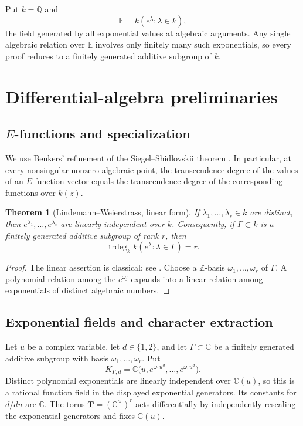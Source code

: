 \documentclass[11pt]{article}
\numberwithin{equation}{section}
\newtheorem{theorem}{Theorem}[section]
\theoremstyle{definition}
\theoremstyle{remark}
\newcommand{\C}{\mathbb C}
\newcommand{\Qbar}{\overline{\mathbb Q}}
\begin{document}
Put $k=\Qbar$ and
\begin{equation}\label{eq:Efield}
  \mathbb E=k(e^\lambda:\lambda\in k),
\end{equation}
the field generated by all exponential values at algebraic arguments.  Any
single algebraic relation over $\mathbb E$ involves only finitely many such
exponentials, so every proof reduces to a finitely generated additive
subgroup of $k$.

\section{Differential-algebra preliminaries}

\subsection{\texorpdfstring{$E$}{E}-functions and specialization}

We use Beukers' refinement of the Siegel--Shidlovskii theorem
\cite{Beukers}.  In particular, at every nonsingular nonzero algebraic point,
the transcendence degree of the values of an $E$-function vector equals the
transcendence degree of the corresponding functions over $k(z)$.

\begin{theorem}[Lindemann--Weierstrass, linear form]
\label{thm:LW}
If $\lambda_1,\ldots,\lambda_s\in k$ are distinct, then
$e^{\lambda_1},\ldots,e^{\lambda_s}$ are linearly independent over $k$.
Consequently, if $\Gamma\subset k$ is a finitely generated additive subgroup
of rank $r$, then
\[
  \operatorname{trdeg}_k k(e^\lambda:\lambda\in\Gamma)=r.
\]
\end{theorem}

\begin{proof}
The linear assertion is classical; see \cite[Chapter~1]{Baker}.  Choose a
$\mathbb Z$-basis $\omega_1,\ldots,\omega_r$ of $\Gamma$.  A polynomial
relation among the $e^{\omega_j}$ expands into a linear relation among
exponentials of distinct algebraic numbers.
\end{proof}

\subsection{Exponential fields and character extraction}

Let $u$ be a complex variable, let $d\in\{1,2\}$, and let
$\Gamma\subset\C$ be a finitely generated additive subgroup with basis
$\omega_1,\ldots,\omega_r$.  Put
\begin{equation}\label{eq:K-Gamma-d}
  K_{\Gamma,d}
  =\C\bigl(u,e^{\omega_1u^d},\ldots,e^{\omega_ru^d}\bigr).
\end{equation}
Distinct polynomial exponentials are linearly independent over $\C(u)$, so
this is a rational function field in the displayed exponential generators.
Its constants for $d/du$ are $\C$.  The torus
$\mathbf T=(\C^\times)^r$ acts differentially by independently rescaling the
exponential generators and fixes $\C(u)$.
\end{document}
